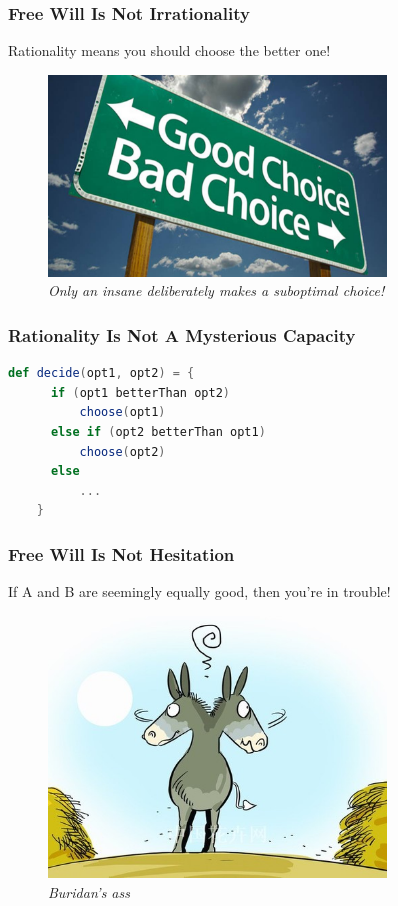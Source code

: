 \documentclass[xcolor=dvipsnames]{beamer}
\theoremstyle{definition}
\begin{document}
\begin{frame}[fragile]
  \frametitle{Free Will Is Not Irrationality}
  Rationality means you should choose the better one!

  \begin{figure}
    \centering
    \includegraphics[width=0.8\textwidth]{images/rationality.jpg}\\
    \emph{Only an insane deliberately makes a suboptimal choice!}
  \end{figure}
\end{frame}

\begin{frame}[fragile]
  \frametitle{Rationality Is Not A Mysterious Capacity}

  \begin{lstlisting}[language=Scala]
    def decide(opt1, opt2) = {
      if (opt1 betterThan opt2)
          choose(opt1)
      else if (opt2 betterThan opt1)
          choose(opt2)
      else
          ...
    }
  \end{lstlisting}
\end{frame}

\begin{frame}[fragile]
  \frametitle{Free Will Is Not Hesitation}
  If A and B are seemingly equally good, then you're in trouble!

  \begin{figure}
    \centering
    \includegraphics[width=0.8\textwidth]{images/ass.jpg}\\
    \emph{Buridan's ass}
  \end{figure}
\end{frame}
\end{document}
